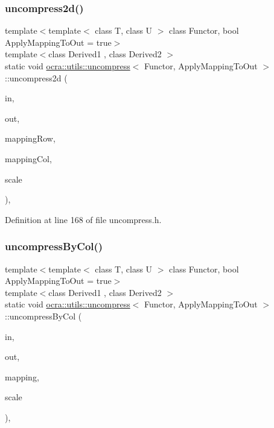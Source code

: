\subsubsection{\texorpdfstring{uncompress2d()}{uncompress2d()}}
{\footnotesize\ttfamily template$<$template$<$ class T, class U $>$ class Functor, bool Apply\+Mapping\+To\+Out = true$>$ \\
template$<$class Derived1 , class Derived2 $>$ \\
static void \hyperlink{structocra_1_1utils_1_1uncompress}{ocra\+::utils\+::uncompress}$<$ Functor, Apply\+Mapping\+To\+Out $>$\+::uncompress2d (\begin{DoxyParamCaption}\item[{const Matrix\+Base$<$ Derived1 $>$ \&}]{in,  }\item[{Matrix\+Base$<$ Derived2 $>$ \&}]{out,  }\item[{const std\+::vector$<$ int $>$ \&}]{mapping\+Row,  }\item[{const std\+::vector$<$ int $>$ \&}]{mapping\+Col,  }\item[{double}]{scale }\end{DoxyParamCaption})\hspace{0.3cm}{\ttfamily [inline]}, {\ttfamily [static]}}



Definition at line 168 of file uncompress.\+h.

\hypertarget{structocra_1_1utils_1_1uncompress_af01bd3d80ed6b71b4733602efacf568f}{}\label{structocra_1_1utils_1_1uncompress_af01bd3d80ed6b71b4733602efacf568f} 
\subsubsection{\texorpdfstring{uncompress\+By\+Col()}{uncompressByCol()}}
{\footnotesize\ttfamily template$<$template$<$ class T, class U $>$ class Functor, bool Apply\+Mapping\+To\+Out = true$>$ \\
template$<$class Derived1 , class Derived2 $>$ \\
static void \hyperlink{structocra_1_1utils_1_1uncompress}{ocra\+::utils\+::uncompress}$<$ Functor, Apply\+Mapping\+To\+Out $>$\+::uncompress\+By\+Col (\begin{DoxyParamCaption}\item[{const Matrix\+Base$<$ Derived1 $>$ \&}]{in,  }\item[{Matrix\+Base$<$ Derived2 $>$ \&}]{out,  }\item[{const std\+::vector$<$ int $>$ \&}]{mapping,  }\item[{double}]{scale }\end{DoxyParamCaption})\hspace{0.3cm}{\ttfamily [inline]}, {\ttfamily [static]}}



